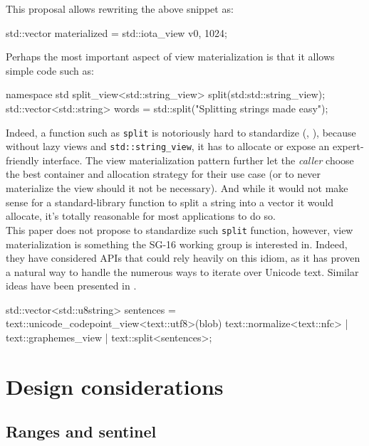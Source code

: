 \documentclass{wg21}
\newcommand{\cc}[1]{\texttt{#1}}
\begin{document}
This proposal allows rewriting the above snippet as:

\begin{codeblock}
    std::vector materialized = std::iota_view v{0, 1024};
\end{codeblock}


Perhaps the most important aspect of view materialization is that it allows simple code such as:

\begin{codeblock}
    namespace std {
        split_view<std::string_view> split(std:std::string_view);
    }
    std::vector<std::string> words = std::split("Splitting strings made easy");
\end{codeblock}

Indeed, a function such as \cc{split} is notoriously hard to standardize (\cite{P0540},  \cite{N3593}), because without lazy views and \cc{std::string_view}, it has to allocate or expose an expert-friendly interface.
The view materialization pattern further let the \emph{caller} choose the best container and allocation strategy for their use case (or to never materialize the view should it not be necessary).
And while it would not make sense for a standard-library function to split a string into a vector it would allocate, it's totally reasonable for most applications to do so.\\

This paper does not propose to standardize such \cc{split} function, however, view materialization is something the SG-16 working group is interested in.
Indeed, they have considered APIs that could rely heavily on this idiom, as it has proven a natural way to handle the numerous ways to iterate over Unicode text.
Similar ideas have been presented in \cite{P1004}.

\begin{codeblock}
    std::vector<std::u8string> sentences =
        text::unicode_codepoint_view<text::utf8>(blob)
        text::normalize<text::nfc> |
        text::graphemes_view |
        text::split<sentences>;
\end{codeblock}

\section{Design considerations}


\subsection{Ranges and sentinel}
\end{document}
